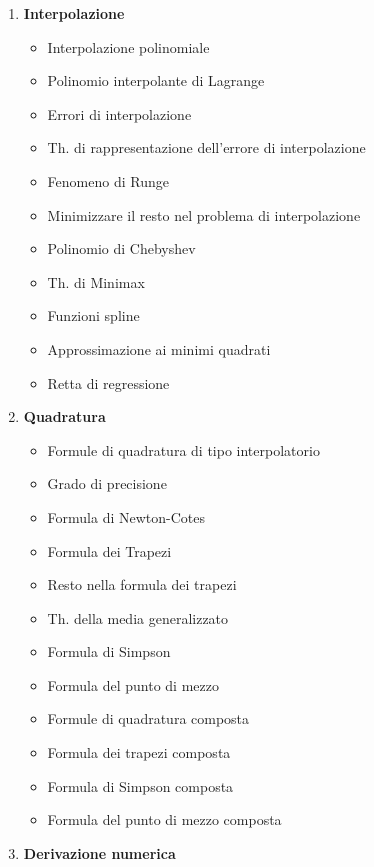 \documentclass[11pt,a4paper]{article}
\begin{document}
\begin{enumerate}
\begin{itemize}
\item Pivoting parziale
\item Pivoting totale
\item Fattorizzazione LU
\item Equivalenza tra Gauss e LU
\item Condizionamento sistemi lineari
\end{itemize}
\item \textbf{Interpolazione}
\begin{itemize}
\item Interpolazione polinomiale
\item Polinomio interpolante di Lagrange
\item Errori di interpolazione
\item Th. di rappresentazione dell’errore di interpolazione
\item Fenomeno di Runge
\item Minimizzare il resto nel problema di interpolazione
\item Polinomio di Chebyshev
\item Th. di Minimax
\item Funzioni spline
\item Approssimazione ai minimi quadrati
\item Retta di regressione
\end{itemize}
\item \textbf{Quadratura}
\begin{itemize}
\item Formule di quadratura di tipo interpolatorio
\item Grado di precisione
\item Formula di Newton-Cotes
\item Formula dei Trapezi
\item Resto nella formula dei trapezi
\item Th. della media generalizzato
\item Formula di Simpson
\item Formula del punto di mezzo
\item Formule di quadratura composta
\item Formula dei trapezi composta
\item Formula di Simpson composta
\item Formula del punto di mezzo composta
\end{itemize}
\item \textbf{Derivazione numerica}
\begin{itemize}

\end{itemize}
\end{enumerate}
\end{document}
